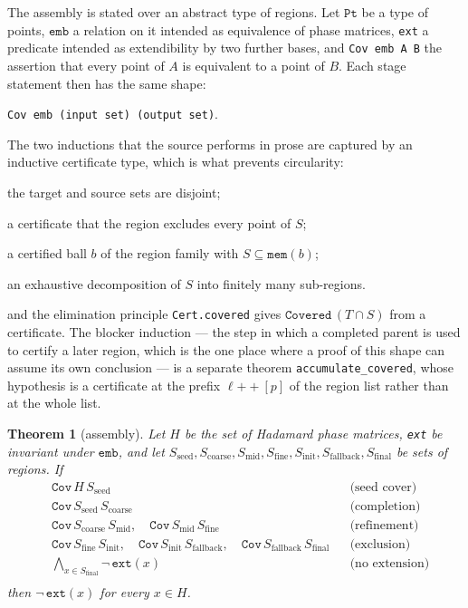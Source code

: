 \documentclass[11pt]{article}
\newtheorem{theorem}{Theorem}
\theoremstyle{definition}
\begin{document}
The assembly is stated over an abstract type of regions. Let $\mathtt{Pt}$ be a type of points,
$\mathtt{emb}$ a relation on it intended as equivalence of phase matrices, \texttt{ext} a predicate
intended as extendibility by two further bases, and \texttt{Cov emb A B} the assertion that every
point of $A$ is equivalent to a point of $B$. Each stage statement then has the same shape:
\begin{center}
\texttt{Cov emb (input set) (output set)}.
\end{center}
The two inductions that the source performs in prose are captured by an inductive certificate type,
which is what prevents circularity:
\begin{description}[leftmargin=1.4em,style=nextline]
\item[\texttt{empty}] the target and source sets are disjoint;
\item[\texttt{excl}] a certificate that the region excludes every point of $S$;
\item[\texttt{ball}] a certified ball $b$ of the region family with $S\subseteq\mathtt{mem}(b)$;
\item[\texttt{union}] an exhaustive decomposition of $S$ into finitely many sub-regions.
\end{description}
and the elimination principle \texttt{Cert.covered} gives $\mathtt{Covered}\,(T\cap S)$ from a
certificate. The blocker induction --- the step in which a completed parent is used to certify a
later region, which is the one place where a proof of this shape can assume its own conclusion ---
is a separate theorem \texttt{accumulate\_covered}, whose hypothesis is a certificate at the prefix
$\ell \mathbin{+\!+} [p]$ of the region list rather than at the whole list.

\begin{theorem}[assembly]\label{thm:assembly}
Let $H$ be the set of Hadamard phase matrices, \texttt{ext} be invariant under $\mathtt{emb}$, and
let $S_{\mathrm{seed}},S_{\mathrm{coarse}},S_{\mathrm{mid}},S_{\mathrm{fine}},
S_{\mathrm{init}},S_{\mathrm{fallback}},S_{\mathrm{final}}$ be sets of regions. If
\begin{align*}
&\mathtt{Cov}\,H\,S_{\mathrm{seed}} &&\text{(seed cover)}\\
&\mathtt{Cov}\,S_{\mathrm{seed}}\,S_{\mathrm{coarse}} &&\text{(completion)}\\
&\mathtt{Cov}\,S_{\mathrm{coarse}}\,S_{\mathrm{mid}},\quad
 \mathtt{Cov}\,S_{\mathrm{mid}}\,S_{\mathrm{fine}} &&\text{(refinement)}\\
&\mathtt{Cov}\,S_{\mathrm{fine}}\,S_{\mathrm{init}},\quad
 \mathtt{Cov}\,S_{\mathrm{init}}\,S_{\mathrm{fallback}},\quad
 \mathtt{Cov}\,S_{\mathrm{fallback}}\,S_{\mathrm{final}} &&\text{(exclusion)}\\
&\textstyle\bigwedge_{x\in S_{\mathrm{final}}}\neg\,\mathtt{ext}(x) &&\text{(no extension)}\\
\end{align*}
then $\neg\,\mathtt{ext}(x)$ for every $x\in H$.
\end{theorem}
\end{document}
